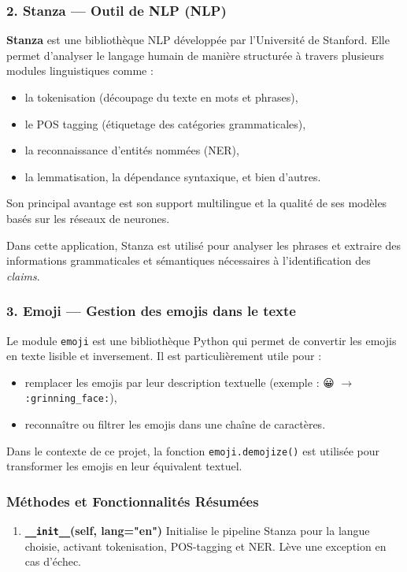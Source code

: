 \begin{description}
\begin{description}
\begin{description}
\begin{itemize}
\subsubsection*{2. Stanza --- Outil de NLP (NLP)}
\textbf{Stanza} est une bibliothèque NLP développée par l'Université de Stanford. Elle permet d'analyser le langage humain de manière structurée à travers plusieurs modules linguistiques comme :
\begin{itemize}
    \item la tokenisation (découpage du texte en mots et phrases),
    \item le POS tagging (étiquetage des catégories grammaticales),
    \item la reconnaissance d'entités nommées (NER),
    \item la lemmatisation, la dépendance syntaxique, et bien d'autres.
\end{itemize}
Son principal avantage est son support multilingue et la qualité de ses modèles basés sur les réseaux de neurones.

Dans cette application, Stanza est utilisé pour analyser les phrases et extraire des informations grammaticales et sémantiques nécessaires à l'identification des \textit{claims}.

\subsubsection*{3. Emoji --- Gestion des emojis dans le texte}
Le module \texttt{emoji} est une bibliothèque Python qui permet de convertir les emojis en texte lisible et inversement. Il est particulièrement utile pour :
\begin{itemize}
    \item remplacer les emojis par leur description textuelle (exemple : 😀 $\rightarrow$ \texttt{:grinning\_face:}),
    \item reconnaître ou filtrer les emojis dans une chaîne de caractères.
\end{itemize}
Dans le contexte de ce projet, la fonction \texttt{emoji.demojize()} est utilisée pour transformer les emojis en leur équivalent textuel.


\subsubsection*{Méthodes et Fonctionnalités Résumées}

\begin{enumerate}
    \item \textbf{\texttt{\_\_init\_\_}(self, lang="en")}  
    Initialise le pipeline Stanza pour la langue choisie, activant tokenisation, POS-tagging et NER. Lève une exception en cas d’échec.


\end{enumerate}
\end{itemize}
\end{description}
\end{description}
\end{description}
